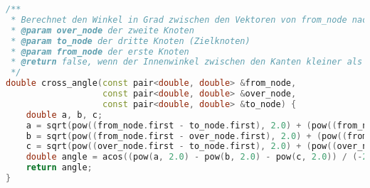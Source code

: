 \documentclass[a4paper,10pt,ngerman]{scrartcl}
\begin{document}
    \newpage
    \begin{lstlisting}[frame=single,language=C++,title=Methode cross\_angle,breaklines=true,label={lst:code_crossAngle}]
/**
 * Berechnet den Winkel in Grad zwischen den Vektoren von from_node nach over_node und over_node nach to_node
 * @param over_node der zweite Knoten
 * @param to_node der dritte Knoten (Zielknoten)
 * @param from_node der erste Knoten
 * @return false, wenn der Innenwinkel zwischen den Kanten kleiner als 90° beträgt, andernfalls true
 */
double cross_angle(const pair<double, double> &from_node,
                   const pair<double, double> &over_node,
                   const pair<double, double> &to_node) {
    double a, b, c;
    a = sqrt(pow((from_node.first - to_node.first), 2.0) + (pow((from_node.second - to_node.second), 2.0)));
    b = sqrt(pow((from_node.first - over_node.first), 2.0) + (pow((from_node.second - over_node.second), 2.0)));
    c = sqrt(pow((over_node.first - to_node.first), 2.0) + (pow((over_node.second - to_node.second), 2.0)));
    double angle = acos((pow(a, 2.0) - pow(b, 2.0) - pow(c, 2.0)) / (-2 * b * c)) * 180 / M_PI;
    return angle;
}
    \end{lstlisting}
\end{document}
